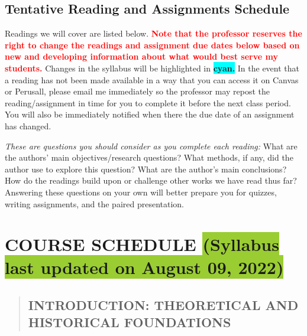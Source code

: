 \documentclass[11pt,]{article}
\begin{document}
\hypertarget{tentative-reading-and-assignments-schedule}{%
\subsection{Tentative Reading and Assignments
Schedule}\label{tentative-reading-and-assignments-schedule}}

Readings we will cover are listed below.
\textcolor{red}{\bf{Note that the professor reserves the right to change the readings and assignment due dates below based on new and developing information about what would best serve my students.}}
Changes in the syllabus will be highlighted in
\colorbox{Cyan}{\bf{cyan.}} In the event that a reading has not been
made available in a way that you can access it on Canvas or Perusall,
please email me immediately so the professor may repost the
reading/assignment in time for you to complete it before the next class
period. You will also be immediately notified when there the due date of
an assignment has changed.

\emph{These are questions you should consider as you complete each
reading:} What are the authors' main objectives/research questions? What
methods, if any, did the author use to explore this question? What are
the author's main conclusions? How do the readings build upon or
challenge other works we have read thus far? Answering these questions
on your own will better prepare you for quizzes, writing assignments,
and the paired presentation.

\hypertarget{course-schedule}{%
\section{\texorpdfstring{COURSE SCHEDULE
\textbf{\colorbox{YellowGreen}{(Syllabus last updated on August 09, 2022) }}}{COURSE SCHEDULE }}\label{course-schedule}}

\vspace{\baselineskip}

\begin{quote}
\hypertarget{introduction-theoretical-and-historical-foundations}{%
\subsection{INTRODUCTION: THEORETICAL AND HISTORICAL
FOUNDATIONS}\label{introduction-theoretical-and-historical-foundations}}
\end{quote}

\bigbreak
\end{document}
